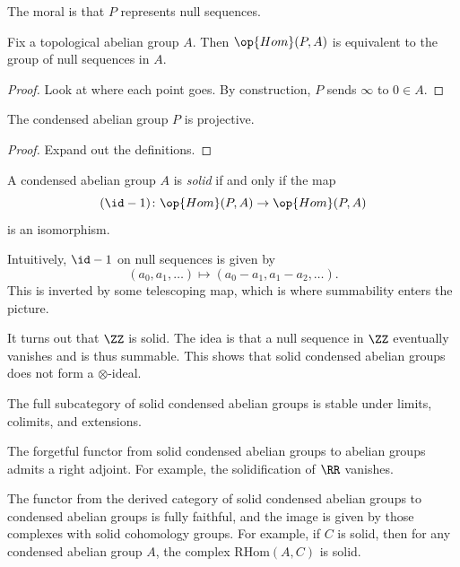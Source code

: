 \documentclass{article}
\begin{document}
The moral is that $P$ represents null sequences.
\begin{lemma}
	Fix a topological abelian group $A$. Then $\op{Hom}(P,A)$ is equivalent to the group of null sequences in $A$.
\end{lemma}
\begin{proof}
	Look at where each point goes. By construction, $P$ sends $\infty$ to $0\in A$.
\end{proof}
\begin{lemma}
	The condensed abelian group $P$ is projective.
\end{lemma}
\begin{proof}
	Expand out the definitions.
\end{proof}
\begin{definition}[solid]
	A condensed abelian group $A$ is \textit{solid} if and only if the map
	\[({\id}-1)\colon\op{Hom}(P,A)\to\op{Hom}(P,A)\]
	is an isomorphism.
\end{definition}
\begin{remark}
	Intuitively, ${\id}-1$ on null sequences is given by
	\[(a_0,a_1,\ldots)\mapsto(a_0-a_1,a_1-a_2,\ldots).\]
	This is inverted by some telescoping map, which is where summability enters the picture.
\end{remark}
\begin{example}
	It turns out that $\ZZ$ is solid. The idea is that a null sequence in $\ZZ$ eventually vanishes and is thus summable. This shows that solid condensed abelian groups does not form a $\otimes$-ideal.
\end{example}
\begin{remark}
	The full subcategory of solid condensed abelian groups is stable under limits, colimits, and extensions.
\end{remark}
\begin{example}
	The forgetful functor from solid condensed abelian groups to abelian groups admits a right adjoint. For example, the solidification of $\RR$ vanishes.
\end{example}
\begin{remark}
	The functor from the derived category of solid condensed abelian groups to condensed abelian groups is fully faithful, and the image is given by those complexes with solid cohomology groups. For example, if $C$ is solid, then for any condensed abelian group $A$, the complex $\mathrm{RHom}(A,C)$ is solid.
\end{remark}
\end{document}
